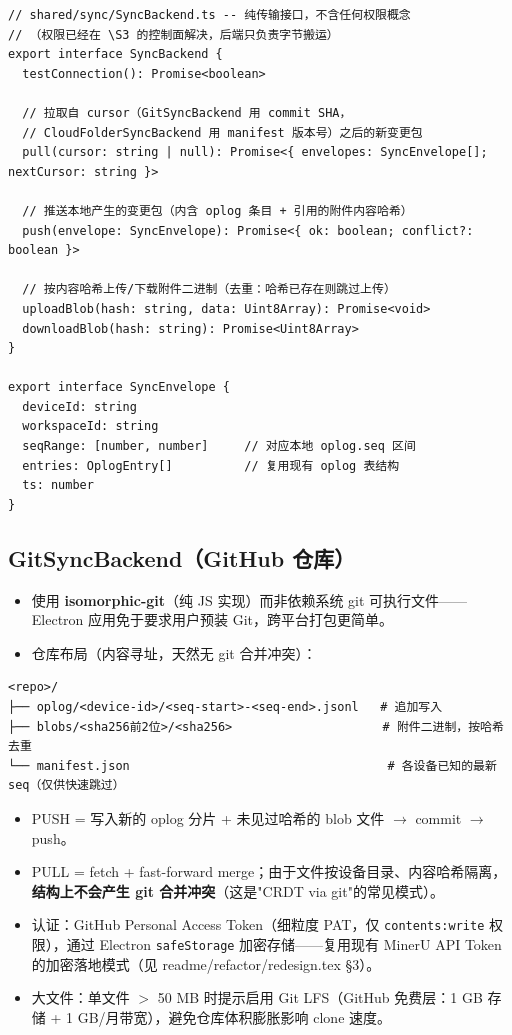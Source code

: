 \documentclass[12pt, a4paper]{article}
\begin{document}
\begin{lstlisting}[language={}]
// shared/sync/SyncBackend.ts -- 纯传输接口，不含任何权限概念
// （权限已经在 \S3 的控制面解决，后端只负责字节搬运）
export interface SyncBackend {
  testConnection(): Promise<boolean>

  // 拉取自 cursor（GitSyncBackend 用 commit SHA，
  // CloudFolderSyncBackend 用 manifest 版本号）之后的新变更包
  pull(cursor: string | null): Promise<{ envelopes: SyncEnvelope[]; nextCursor: string }>

  // 推送本地产生的变更包（内含 oplog 条目 + 引用的附件内容哈希）
  push(envelope: SyncEnvelope): Promise<{ ok: boolean; conflict?: boolean }>

  // 按内容哈希上传/下载附件二进制（去重：哈希已存在则跳过上传）
  uploadBlob(hash: string, data: Uint8Array): Promise<void>
  downloadBlob(hash: string): Promise<Uint8Array>
}

export interface SyncEnvelope {
  deviceId: string
  workspaceId: string
  seqRange: [number, number]     // 对应本地 oplog.seq 区间
  entries: OplogEntry[]          // 复用现有 oplog 表结构
  ts: number
}
\end{lstlisting}

\subsection{GitSyncBackend（GitHub 仓库）}

\begin{itemize}[leftmargin=2em, itemsep=2pt]
  \item 使用 \textbf{isomorphic-git}（纯 JS 实现）而非依赖系统 git 可执行文件——
        Electron 应用免于要求用户预装 Git，跨平台打包更简单。
  \item 仓库布局（内容寻址，天然无 git 合并冲突）：
\end{itemize}

\begin{lstlisting}[language={}, numbers=none]
<repo>/
├── oplog/<device-id>/<seq-start>-<seq-end>.jsonl   # 追加写入
├── blobs/<sha256前2位>/<sha256>                     # 附件二进制，按哈希去重
└── manifest.json                                    # 各设备已知的最新 seq（仅供快速跳过）
\end{lstlisting}

\begin{itemize}[leftmargin=2em, itemsep=2pt]
  \item PUSH = 写入新的 oplog 分片 + 未见过哈希的 blob 文件 $\to$ commit $\to$ push。
  \item PULL = fetch + fast-forward merge；由于文件按设备目录、内容哈希隔离，
        \textbf{结构上不会产生 git 合并冲突}（这是"CRDT via git"的常见模式）。
  \item 认证：GitHub Personal Access Token（细粒度 PAT，仅 \texttt{contents:write}
        权限），通过 Electron \texttt{safeStorage} 加密存储——复用现有 MinerU API
        Token 的加密落地模式（见 readme/refactor/redesign.tex \S3）。
  \item 大文件：单文件 $>$ 50 MB 时提示启用 Git LFS（GitHub 免费层：1 GB 存储 +
        1 GB/月带宽），避免仓库体积膨胀影响 clone 速度。
\end{itemize}
\end{document}
